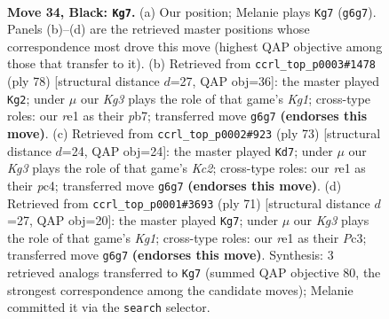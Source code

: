 \documentclass[11pt]{article}
\begin{document}
\clearpage

\begin{figure}[p]\centering
\begin{subfigure}{0.46\textwidth}\centering
\resizebox{\linewidth}{!}{%
\newchessgame
\chessboard[
  setfen={1r6/1p3p2/p3p1k1/8/P7/4PP1P/1R5P/4R1K1 b - - 0 34},
  showmover=false,
  pgfstyle=straightmove, color=movearrow, markmove={g6-g7}
]}
\caption{}
\end{subfigure}\hfill
\begin{subfigure}{0.46\textwidth}\centering
\resizebox{\linewidth}{!}{%
\newchessgame
\chessboard[
  setfen={6k1/1p2r1p1/2p5/4pp2/2P4P/6P1/1P3P2/4R1K1 w - - 0 40},
  showmover=false,
  pgfstyle=straightmove, color=movearrow, markmove={g1-g2}
]}
\caption{}
\end{subfigure}
\\[4pt]
\begin{subfigure}{0.46\textwidth}\centering
\resizebox{\linewidth}{!}{%
\newchessgame
\chessboard[
  setfen={r7/2k1pp2/6p1/2K4p/p1P4P/4P3/R4PP1/8 b - - 1 37},
  showmover=false,
  pgfstyle=straightmove, color=movearrow, markmove={c7-d7}
]}
\caption{}
\end{subfigure}\hfill
\begin{subfigure}{0.46\textwidth}\centering
\resizebox{\linewidth}{!}{%
\newchessgame
\chessboard[
  setfen={r5k1/5p2/P3p1p1/2p4p/7P/1Pp5/R4PP1/6K1 b - - 0 36},
  showmover=false,
  pgfstyle=straightmove, color=movearrow, markmove={g8-g7}
]}
\caption{}
\end{subfigure}
\caption{\textbf{Move 34, Black: \texttt{Kg7}.} (a) Our position; Melanie plays \texttt{Kg7} (\texttt{g6g7}). Panels (b)--(d) are the retrieved master positions whose correspondence most drove this move (highest QAP objective among those that transfer to it). (b) Retrieved from \texttt{ccrl\_top\_p0003\#1478} (ply 78) [structural distance $d$=27, QAP obj=36]: the master played \texttt{Kg2}; under $\mu$ our \emph{Kg3} plays the role of that game's \emph{Kg1}; cross-type roles: our \emph{r}e1 as their \emph{p}b7; transferred move \texttt{g6g7} \textbf{(endorses this move)}. (c) Retrieved from \texttt{ccrl\_top\_p0002\#923} (ply 73) [structural distance $d$=24, QAP obj=24]: the master played \texttt{Kd7}; under $\mu$ our \emph{Kg3} plays the role of that game's \emph{Kc2}; cross-type roles: our \emph{r}e1 as their \emph{p}c4; transferred move \texttt{g6g7} \textbf{(endorses this move)}. (d) Retrieved from \texttt{ccrl\_top\_p0001\#3693} (ply 71) [structural distance $d$=27, QAP obj=20]: the master played \texttt{Kg7}; under $\mu$ our \emph{Kg3} plays the role of that game's \emph{Kg1}; cross-type roles: our \emph{r}e1 as their \emph{P}c3; transferred move \texttt{g6g7} \textbf{(endorses this move)}. Synthesis: 3 retrieved analogs transferred to \texttt{Kg7} (summed QAP objective 80, the strongest correspondence among the candidate moves); Melanie committed it via the \texttt{search} selector.}
\label{fig:thought-m67}
\end{figure}
\end{document}
